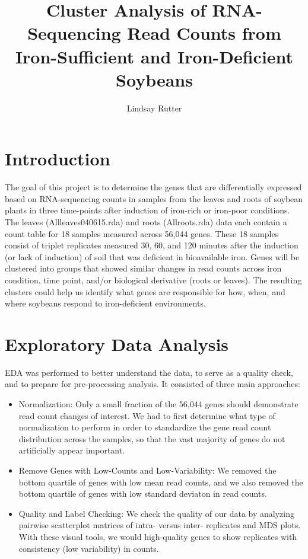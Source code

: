 \documentclass{article}
\begin{document}


\author{Lindsay Rutter}
\title{Cluster Analysis of RNA-Sequencing Read Counts from Iron-Sufficient and Iron-Deficient Soybeans}

\maketitle


\section*{Introduction}

The goal of this project is to determine the genes that are differentially expressed based on RNA-sequencing counts in samples from the leaves and roots of soybean plants in three time-points after induction of iron-rich or iron-poor conditions. The leaves (Allleaves040615.rda) and roots (Allroots.rda) data each contain a count table for 18 samples measured across 56,044 genes. These 18 samples consist of triplet replicates measured 30, 60, and 120 minutes after the induction (or lack of induction) of soil that was deficient in bioavailable iron. Genes will be clustered into groups that showed similar changes in read counts across iron condition, time point, and/or biological derivative (roots or leaves). The resulting clusters could help us identify what genes are responsible for how, when, and where soybeans respond to iron-deficient environments.

\section*{Exploratory Data Analysis}

EDA was performed to better understand the data, to serve as a quality check, and to prepare for pre-processing analysis. It consisted of three main approaches:

\begin{itemize}

\item Normalization: Only a small fraction of the 56,044 genes should demonstrate read count changes of interest. We had to first determine what type of normalization to perform in order to standardize the gene read count distribution across the samples, so that the vast majority of genes do not artificially appear important.

\item Remove Genes with Low-Counts and Low-Variability: We removed the bottom quartile of genes with low mean read counts, and we also removed the bottom quartile of genes with low standard deviaton in read counts.

\item Quality and Label Checking: We check the quality of our data by analyzing pairwise scatterplot matrices of intra- versus inter- replicates and MDS plots. With these visual tools, we would high-quality genes to show replicates with consistency (low variability) in counts.

\end{itemize}
\end{document}
